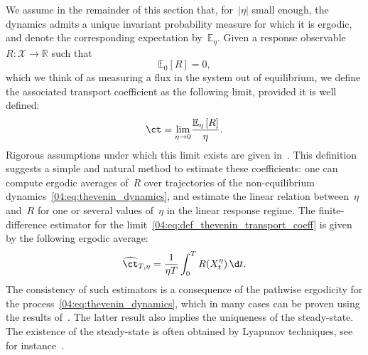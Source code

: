 We assume in the remainder of this section that, for~$|\eta|$ small enough, the dynamics admits a unique invariant probability measure for which it is ergodic, and denote the corresponding expectation by~$\mathbb{E}_\eta$. Given a response observable~$R : \mathcal X \to \mathbb R$ such that
\begin{equation}
\label{04:eq:R_centered_Thevenin}
   \mathbb{E}_0\left[ R\right]=0, 
\end{equation} which we think of as measuring a flux in the system out of equilibrium, we define the associated transport coefficient as the following limit, provided it is well defined:
\begin{equation}
    \label{04:eq:def_thevenin_transport_coeff}
    \ct = \underset{\eta\to 0}{\lim}\frac{\mathbb{E}_{\eta}\left[R\right]}{\eta}.
\end{equation}
Rigorous assumptions under which this limit exists are given in~\cite{HM10}. This definition suggests a simple and natural method to estimate these coefficients: one can compute ergodic averages of~$R$ over trajectories of the non-equilibrium dynamics~\eqref{04:eq:thevenin_dynamics}, and estimate the linear relation between~$\eta$ and~$R$ for one or several values of~$\eta$ in the linear response regime. The finite-difference estimator for the limit~\eqref{04:eq:def_thevenin_transport_coeff} is given by the following ergodic average:
\begin{equation}
    \label{04:eq:thevenin_rho_estimators_continuous_time}
    \widehat{\ct}_{T,\eta}=\frac1{\eta T}\int_0^T R(X^\eta_t)\,\d t.
\end{equation}
The consistency of such estimators is a consequence of the pathwise ergodicity for the process~\eqref{04:eq:thevenin_dynamics}, which in many cases can be proven using the results of~\cite{K87}. The latter result also implies the uniqueness of the steady-state. The existence of the steady-state is often obtained by Lyapunov techniques, see for instance~\cite[Theorem~8.3]{RB06}.

